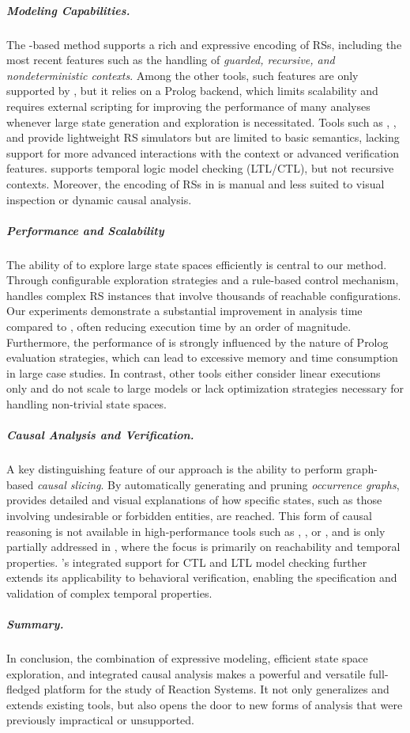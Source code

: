 \subparagraph*{Modeling Capabilities.}
The \GROOVE-based method supports a rich and expressive encoding of RSs, including the most recent features such as the handling of \emph{guarded, recursive, and nondeterministic contexts}.
Among the other tools, such features are only supported by \BioResolve, but it relies on a Prolog backend, which limits scalability and requires external scripting for improving the performance of many analyses whenever large state generation and exploration is necessitated. Tools such as \HERESY, \WebRSim, and \clrs provide lightweight RS simulators but are limited to basic semantics, lacking support for more advanced interactions with the context or advanced verification features. \ccReact supports temporal logic model checking (LTL/CTL), but not recursive contexts. Moreover, the encoding of RSs in \ccReact is manual and less suited to visual inspection or dynamic causal analysis.

\subparagraph*{Performance and Scalability}
The ability of \GROOVE to explore large state spaces efficiently is central to our method. Through configurable exploration strategies and a rule-based control mechanism, \GROOVE handles complex RS instances that involve thousands of reachable configurations. Our experiments demonstrate a substantial improvement in analysis time compared to \BioResolve, often reducing execution time by an order of magnitude. Furthermore, the performance of \BioResolve is strongly influenced by the nature of Prolog evaluation strategies, which can lead to excessive memory and time consumption in large case studies.
In contrast, other tools either consider linear executions only and do not scale to large models or lack optimization strategies necessary for handling non-trivial state spaces. 

\subparagraph*{Causal Analysis and Verification.}
A key distinguishing feature of our approach is the ability to perform graph-based \emph{causal slicing}. By automatically generating and pruning \emph{occurrence graphs}, \GROOVE provides detailed and visual explanations of how specific states, such as those involving undesirable or forbidden entities, are reached.
This form of causal reasoning is not available in high-performance tools such as \HERESY, \WebRSim, or \clrs, and is only partially addressed in \ccReact, where the focus is primarily on reachability and temporal properties. 
\GROOVE's integrated support for CTL and LTL model checking further extends its applicability to behavioral verification, enabling the specification and validation of complex temporal properties. 

\subparagraph*{Summary.}
In conclusion, the combination of expressive modeling, efficient state space exploration, and integrated causal analysis makes \GROOVE a powerful and versatile full-fledged platform for the study of Reaction Systems. It not only generalizes and extends existing tools, but also opens the door to new forms of analysis that were previously impractical or unsupported.










